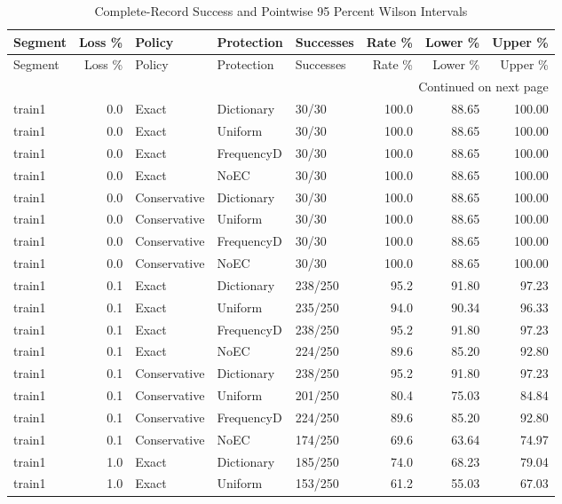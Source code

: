 \begingroup\small\setlength{\tabcolsep}{5pt}
\begin{longtable}{@{}lrlllrrr@{}}
\caption{Complete-Record Success and Pointwise 95 Percent Wilson Intervals}\label{tab:key-c3-statistics}\\
\toprule Segment & Loss \% & Policy & Protection & Successes & Rate \% & Lower \% & Upper \%\\\midrule\endfirsthead
\toprule Segment & Loss \% & Policy & Protection & Successes & Rate \% & Lower \% & Upper \%\\\midrule\endhead
\midrule\multicolumn{8}{r}{Continued on next page}\\\endfoot
\bottomrule\endlastfoot
train1 & 0.0 & Exact & Dictionary & 30/30 & 100.0 & 88.65 & 100.00\\
train1 & 0.0 & Exact & Uniform & 30/30 & 100.0 & 88.65 & 100.00\\
train1 & 0.0 & Exact & FrequencyD & 30/30 & 100.0 & 88.65 & 100.00\\
train1 & 0.0 & Exact & NoEC & 30/30 & 100.0 & 88.65 & 100.00\\
train1 & 0.0 & Conservative & Dictionary & 30/30 & 100.0 & 88.65 & 100.00\\
train1 & 0.0 & Conservative & Uniform & 30/30 & 100.0 & 88.65 & 100.00\\
train1 & 0.0 & Conservative & FrequencyD & 30/30 & 100.0 & 88.65 & 100.00\\
train1 & 0.0 & Conservative & NoEC & 30/30 & 100.0 & 88.65 & 100.00\\
train1 & 0.1 & Exact & Dictionary & 238/250 & 95.2 & 91.80 & 97.23\\
train1 & 0.1 & Exact & Uniform & 235/250 & 94.0 & 90.34 & 96.33\\
train1 & 0.1 & Exact & FrequencyD & 238/250 & 95.2 & 91.80 & 97.23\\
train1 & 0.1 & Exact & NoEC & 224/250 & 89.6 & 85.20 & 92.80\\
train1 & 0.1 & Conservative & Dictionary & 238/250 & 95.2 & 91.80 & 97.23\\
train1 & 0.1 & Conservative & Uniform & 201/250 & 80.4 & 75.03 & 84.84\\
train1 & 0.1 & Conservative & FrequencyD & 224/250 & 89.6 & 85.20 & 92.80\\
train1 & 0.1 & Conservative & NoEC & 174/250 & 69.6 & 63.64 & 74.97\\
train1 & 1.0 & Exact & Dictionary & 185/250 & 74.0 & 68.23 & 79.04\\
train1 & 1.0 & Exact & Uniform & 153/250 & 61.2 & 55.03 & 67.03\\

\end{longtable}
